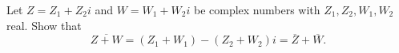 Let $Z=Z_1+Z_2i$ and $W=W_1+W_2i$ be complex numbers with $Z_1,Z_2,W_1,W_2$ real. Show that
\[
\overline{Z+W}=(Z_1+W_1)-(Z_2+W_2)i=\overline Z+\overline W .
\]
